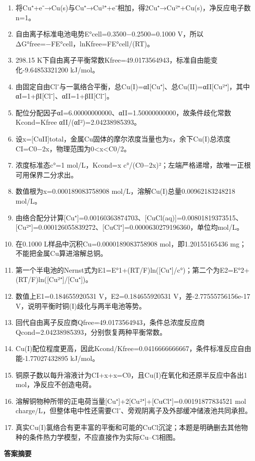 \documentclass[UTF8,11pt,a4paper]{ctexart}
\begin{document}
\begin{enumerate}
\item 将Cu⁺+e⁻→Cu(s)与Cu⁺→Cu²⁺+e⁻相加，得2Cu⁺→Cu²⁺+Cu(s)，净反应电子数n=1。
\item 自由离子标准电池电势E°cell=0.3500−0.2500=0.1000 V，所以ΔG°free=−FE°cell，lnKfree=FE°cell/(RT)。
\item 298.15 K下自由离子平衡常数Kfree=49.0173564943，标准自由能变化-9.64853321200 kJ/mol。
\item 由固定自由Cl⁻与一氯络合平衡，总Cu(I)=αI[Cu⁺]、总Cu(II)=αII[Cu²⁺]，其中αI=1+βI[Cl⁻]、αII=1+βII[Cl⁻]。
\item 配位分配因子αI=6.00000000000、αII=1.50000000000，故条件歧化常数Kcond=Kfree αII/(αI²)=2.04238985393。
\item 设x=[CuII]total，金属Cu固体的摩尔浓度当量也为x，余下Cu(I)总浓度CI=C0−2x，物理范围为0<x<C0/2。
\item 浓度标准态c°=1 mol/L，Kcond=x c°/(C0−2x)²；左端严格递增，故唯一正根可用保界二分求出。
\item 数值根为x=0.000189083758908 mol/L，溶解Cu(I)总量0.00962183248218 mol/L。
\item 由络合配分计算[Cu⁺]=0.00160363874703、[CuCl(aq)]=0.00801819373515、[Cu²⁺]=0.000126055839272、[CuCl⁺]=0.0000630279196360，单位均mol/L。
\item 在0.1000 L样品中沉积Cu=0.0000189083758908 mol，即1.20155165436 mg；不能把金属Cu算进溶解总铜。
\item 第一个半电池的Nernst式为E1=E°1+(RT/F)ln([Cu⁺]/c°)；第二个为E2=E°2+(RT/F)ln([Cu²⁺]/[Cu⁺])。
\item 数值上E1=0.184655920531 V，E2=0.184655920531 V，差-2.77555756156e-17 V，说明平衡时铜(I)歧化与两半电池等势。
\item 回代自由离子反应商Qfree=49.0173564943，条件总浓度反应商Qcond=2.04238985393，分别恢复两种平衡常数。
\item Cu(I)配位程度更高，因此Kcond/Kfree=0.0416666666667，条件标准反应自由能-1.77027432895 kJ/mol。
\item 铜原子数以每升溶液计为CI+x+x=C0，且Cu(I)在氧化和还原半反应中各出1 mol，净反应不创造电荷。
\item 溶解铜物种所带的正电荷当量[Cu⁺]+2[Cu²⁺]+[CuCl⁺]=0.00191877834521 mol charge/L，但整体电中性还需要Cl⁻、旁观阴离子及外部缓冲储液池共同承担。
\item 真实Cu(I)氯络合有更丰富的平衡和可能的CuCl沉淀；本题是明确删去其他物种的条件热力学模型，不应直接作为实际Cu–Cl相图。
\end{enumerate}
\noindent\textbf{答案摘要}\par
\end{document}
